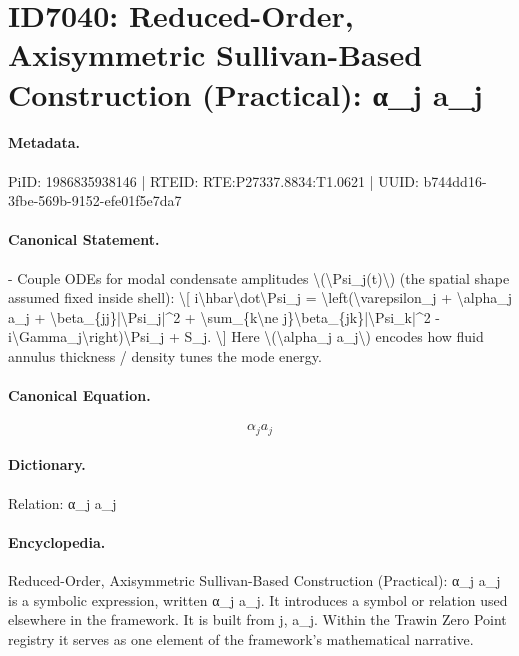 \section*{ID7040: Reduced-Order, Axisymmetric Sullivan-Based Construction (Practical): α\_j a\_j}
\paragraph{Metadata.}
PiID: 1986835938146 | RTEID: RTE:P27337.8834:T1.0621 | UUID: b744dd16-3fbe-569b-9152-efe01f5e7da7

\paragraph{Canonical Statement.}
- Couple ODEs for modal condensate amplitudes \textbackslash{}(\textbackslash{}Psi\_j(t)\textbackslash{}) (the spatial shape assumed fixed inside shell): \textbackslash{}[ i\textbackslash{}hbar\textbackslash{}dot\textbackslash{}Psi\_j = \textbackslash{}left(\textbackslash{}varepsilon\_j + \textbackslash{}alpha\_j a\_j + \textbackslash{}beta\_\{jj\}|\textbackslash{}Psi\_j|\textasciicircum{}2 + \textbackslash{}sum\_\{k\textbackslash{}ne j\}\textbackslash{}beta\_\{jk\}|\textbackslash{}Psi\_k|\textasciicircum{}2 - i\textbackslash{}Gamma\_j\textbackslash{}right)\textbackslash{}Psi\_j + S\_j. \textbackslash{}] Here \textbackslash{}(\textbackslash{}alpha\_j a\_j\textbackslash{}) encodes how fluid annulus thickness / density tunes the mode energy.

\paragraph{Canonical Equation.}
\[
\alpha_j a_j
\]

\paragraph{Dictionary.}
Relation: α\_j a\_j

\paragraph{Encyclopedia.}
Reduced-Order, Axisymmetric Sullivan-Based Construction (Practical): α\_j a\_j is a symbolic expression, written α\_j a\_j. It introduces a symbol or relation used elsewhere in the framework. It is built from j, a\_j. Within the Trawin Zero Point registry it serves as one element of the framework's mathematical narrative.

